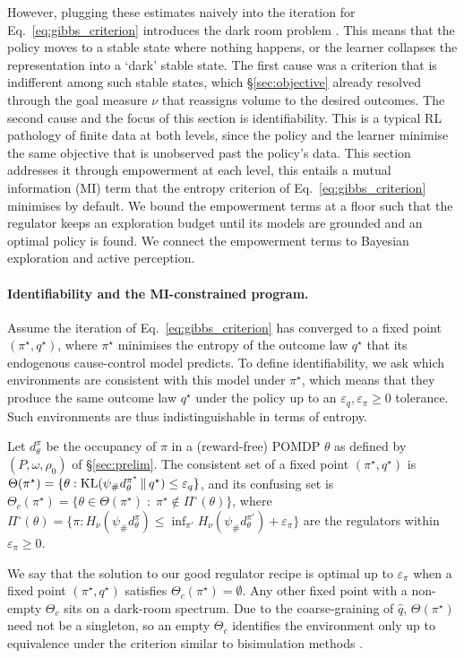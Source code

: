 However, plugging these estimates naively into the iteration for Eq.~\eqref{eq:gibbs_criterion} introduces the dark room problem \citep{Friston-dark12}.
This means that the policy moves to a stable state where nothing happens, or the learner collapses the representation into a `dark' stable state.
The first cause was a criterion that is indifferent among such stable states, which \S\ref{sec:objective} already resolved through the goal measure $\nu$ that reassigns volume to the desired outcomes.
The second cause and the focus of this section is identifiability.
This is a typical RL pathology of finite data at both levels, since the policy and the learner minimise the same objective that is unobserved past the policy's data.
This section addresses it through empowerment at each level, this entails a mutual information (MI) term that the entropy criterion of Eq.~\eqref{eq:gibbs_criterion} minimises by default.
We bound the empowerment terms at a floor such that the regulator keeps an exploration budget until its models are grounded and an optimal policy is found.
We connect the empowerment terms to Bayesian exploration and active perception.

\paragraph{Identifiability and the MI-constrained program.}
Assume the iteration of Eq.~\eqref{eq:gibbs_criterion} has converged to a fixed point $(\pi^\star, q^\star)$, where $\pi^\star$ minimises the entropy of the outcome law $q^\star$ that its endogenous cause-control model predicts.
To define identifiability, we ask which environments are consistent with this model under $\pi^\star$, which means that they produce the same outcome law $q^\star$ under the policy up to an $\varepsilon_q,\varepsilon_\pi \ge 0 $ tolerance.
Such environments are thus indistinguishable in terms of entropy.
\begin{definition}
\label{def:confusing}
    Let $d^{\pi}_\theta$ be the occupancy of $\pi$ in a (reward-free) POMDP $\theta$ as defined by $(P, \omega, \rho_0)$ of \S\ref{sec:prelim}.
    The consistent set of a fixed point $(\pi^\star, q^\star)$ is $\Theta(\pi^\star) = \{ \theta : \mathrm{KL}(\psi_\# d^{\pi^\star}_\theta \,\|\, q^\star) \le \varepsilon_q \}$, and its confusing set is $\Theta_c(\pi^\star) = \big\{ \theta \in \Theta(\pi^\star) \;:\; \pi^\star \notin \Pi^\circ(\theta) \big\}$, where $\Pi^\circ(\theta) = \{ \pi : H_\nu(\psi_\# d^{\pi}_\theta) \le \inf_{\pi'} H_\nu(\psi_\# d^{\pi'}_\theta) + \varepsilon_\pi \}$ are the regulators within $\varepsilon_\pi \ge 0$.
\end{definition}
We say that the solution to our good regulator recipe is optimal up to $\varepsilon_\pi$ when a fixed point $(\pi^\star, q^\star)$ satisfies $\Theta_c(\pi^\star) = \emptyset$.
Any other fixed point with a non-empty $\Theta_c$ sits on a dark-room spectrum.
Due to the coarse-graining of $\hat q$, $\Theta(\pi^\star)$ need not be a singleton, so an empty $\Theta_c$ identifies the environment only up to equivalence under the criterion similar to bisimulation methods \citep{Givan-equivalence03}.


